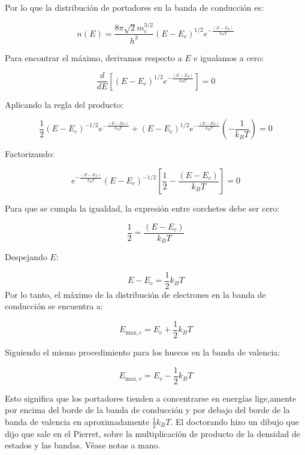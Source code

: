 \begin{enumerate}[label=\alph*)]
		      Por lo que la distribución de portadores en la banda de conducción es:

		      \[
			      n(E) = \frac{8\pi \sqrt{2} m_c^{3/2}}{h^3} (E - E_c)^{1/2} e^{-\frac{(E - E_F)}{k_B T}}
		      \]

		      Para encontrar el máximo, derivamos respecto a \( E \) e igualamos a cero:

		      \[
			      \frac{d}{dE} \left[ (E - E_c)^{1/2} e^{-\frac{(E - E_F)}{k_B T}} \right] = 0
		      \]

		      Aplicando la regla del producto:

		      \[
			      \frac{1}{2} (E - E_c)^{-1/2} e^{-\frac{(E - E_F)}{k_B T}} + (E - E_c)^{1/2} e^{-\frac{(E - E_F)}{k_B T}} \left(-\frac{1}{k_B T} \right) = 0
		      \]

		      Factorizando:

		      \[
			      e^{-\frac{(E - E_F)}{k_B T}} (E - E_c)^{-1/2} \left[ \frac{1}{2} - \frac{(E - E_c)}{k_B T} \right] = 0
		      \]

		      Para que se cumpla la igualdad, la expresión entre corchetes debe ser cero:

		      \[
			      \frac{1}{2} = \frac{(E - E_c)}{k_B T}
		      \]

		      Despejando \( E \):

		      \[
			      E - E_c = \frac{1}{2} k_B T
		      \]
		      Por lo tanto, el máximo de la distribución de electrones en la banda de conducción se encuentra a:

		      \[
			      E_{\text{max}, c} = E_c + \frac{1}{2} k_B T
		      \]

		      Siguiendo el mismo procedimiento para los huecos en la banda de valencia:

		      \[
			      E_{\text{max}, v} = E_v - \frac{1}{2} k_B T
		      \]

		      Esto significa que los portadores tienden a concentrarse en energías lige,amente por encima del borde de la banda de conducción y por debajo del borde de la banda de valencia en aproximadamente \( \frac{1}{2} k_B T \). El doctorando hizo un dibujo que dijo que sale en el Pierret, sobre la multiplicación de producto de la densidad de estados y las bandas. Véase notas a mano.

	\end{enumerate}
